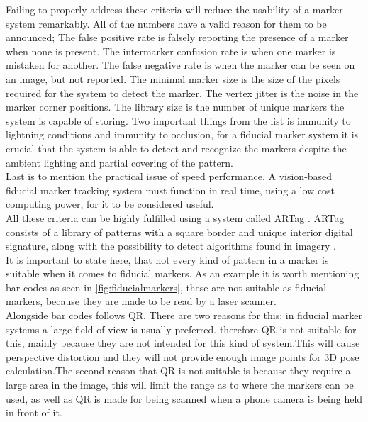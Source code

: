 				Failing to properly address these criteria will reduce the usability of a marker system remarkably\cite{fiducialMarkers}. All of the numbers have a valid reason for them to be announced; The false positive rate is falsely reporting the presence of a marker when none is present. The intermarker confusion rate is when one marker is mistaken for another. The false negative rate is when the marker can be seen on an image, but not reported. The minimal marker size is the size of the pixels required for the system to detect the marker. The vertex jitter is the noise in the marker corner positions. The library size is the number of unique markers the system is capable of storing. Two important things from the list is immunity to lightning conditions and immunity to occlusion, for a fiducial marker system it is crucial that the system is able to detect and recognize the markers despite the ambient lighting and partial covering of the pattern.\\
				Last is to mention the practical issue of speed performance. A vision-based fiducial marker tracking system must function in real time, using a low cost computing power, for it to be considered useful.\\
				
				All these criteria can be highly fulfilled using a system called ARTag \cite{fiducialARTag}. ARTag consists of a library of patterns with a square border and unique interior digital signature, along with the possibility to detect algorithms found in imagery \cite{fiducialMarkers}.\\
				
				It is important to state here, that not every kind of pattern in a marker is suitable when it comes to fiducial markers\cite{fiducialMarkers}. As an example it is worth mentioning bar codes as seen in \autoref{fig:fiducialmarkers}, these are not suitable as fiducial markers, because they are made to be read by a laser scanner.\\
				Alongside bar codes follows QR. There are two reasons for this; in fiducial marker systems a large field of view is usually preferred. therefore QR is not suitable for this, mainly because they are not intended for this kind of system.This will cause perspective distortion and they will not provide enough image points for 3D pose calculation.The second reason that QR is not suitable is because they require a large area in the image, this will limit the range as to where the markers can be used, as well as QR is made for being scanned when a phone camera is being held in front of it.\\ 
				
